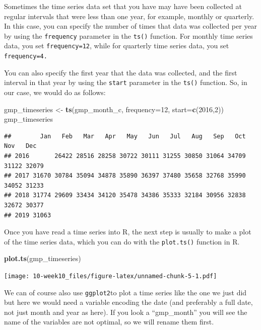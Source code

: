 \documentclass[]{book}
\newenvironment{Shaded}{\begin{snugshade}}{\end{snugshade}}
\newcommand{\DataTypeTok}[1]{\textcolor[rgb]{0.13,0.29,0.53}{#1}}
\newcommand{\DecValTok}[1]{\textcolor[rgb]{0.00,0.00,0.81}{#1}}
\newcommand{\KeywordTok}[1]{\textcolor[rgb]{0.13,0.29,0.53}{\textbf{#1}}}
\newcommand{\NormalTok}[1]{#1}
\newcommand{\StringTok}[1]{\textcolor[rgb]{0.31,0.60,0.02}{#1}}
\begin{document}
Sometimes the time series data set that you have may have been collected at regular intervals that were less than one year, for example, monthly or quarterly. In this case, you can specify the number of times that data was collected per year by using the \texttt{frequency} parameter in the \texttt{ts()} function. For monthly time series data, you set \texttt{frequency=12}, while for quarterly time series data, you set \texttt{frequency=4.}

You can also specify the first year that the data was collected, and the first interval in that year by using the \texttt{start} parameter in the \texttt{ts()} function. So, in our case, we would do as follows:

\begin{Shaded}
\begin{Highlighting}[]
\NormalTok{gmp_timeseries <-}\StringTok{ }\KeywordTok{ts}\NormalTok{(gmp_month_c, }\DataTypeTok{frequency=}\DecValTok{12}\NormalTok{, }\DataTypeTok{start=}\KeywordTok{c}\NormalTok{(}\DecValTok{2016}\NormalTok{,}\DecValTok{2}\NormalTok{))}
\NormalTok{gmp_timeseries}
\end{Highlighting}
\end{Shaded}

\begin{verbatim}
##        Jan   Feb   Mar   Apr   May   Jun   Jul   Aug   Sep   Oct   Nov   Dec
## 2016       26422 28516 28258 30722 30111 31255 30850 31064 34709 31122 32079
## 2017 31670 30784 35094 34878 35890 36397 37480 35658 32768 35990 34052 31233
## 2018 31774 29609 33434 34120 35478 34386 35333 32184 30956 32838 32672 30377
## 2019 31063
\end{verbatim}

Once you have read a time series into R, the next step is usually to make a plot of the time series data, which you can do with the \texttt{plot.ts()} function in R.

\begin{Shaded}
\begin{Highlighting}[]
\KeywordTok{plot.ts}\NormalTok{(gmp_timeseries)}
\end{Highlighting}
\end{Shaded}

\texttt{[image: 10-week10\_files/figure-latex/unnamed-chunk-5-1.pdf]}

We can of course also use \texttt{ggplot2}to plot a time series like the one we just did but here we would need a variable encoding the date (and preferably a full date, not just month and year as here). If you look a ``gmp\_month'' you will see the name of the variables are not optimal, so we will rename them first.
\end{document}
